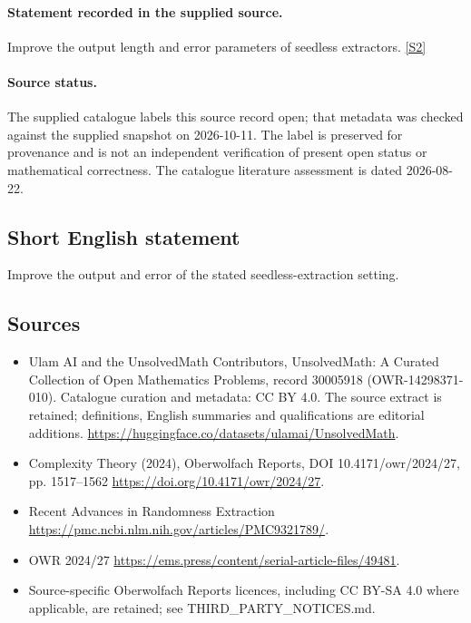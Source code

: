 \documentclass[11pt]{article}
\begin{document}
\paragraph{Statement recorded in the supplied source.}
Improve the output length and error parameters of seedless extractors. \href{https://doi.org/10.4171/owr/2024/27}{[S2]}
\paragraph{Source status.}
The supplied catalogue labels this source record open; that metadata was checked against the supplied snapshot on 2026-10-11. The label is preserved for provenance and is not an independent verification of present open status or mathematical correctness. The catalogue literature assessment is dated 2026-08-22.
\subsection{Short English statement}
Improve the output and error of the stated seedless-extraction setting.
\subsection{Sources}
\begin{itemize}
\item[S1] Ulam AI and the UnsolvedMath Contributors, UnsolvedMath: A Curated Collection of Open Mathematics Problems, record 30005918 (OWR-14298371-010). Catalogue curation and metadata: CC BY 4.0. The source extract is retained; definitions, English summaries and qualifications are editorial additions.
\url{https://huggingface.co/datasets/ulamai/UnsolvedMath}.
\item[S2] Complexity Theory (2024), Oberwolfach Reports, DOI 10.4171/owr/2024/27, pp. 1517--1562
\url{https://doi.org/10.4171/owr/2024/27}.
\item[S3] Recent Advances in Randomness Extraction
\url{https://pmc.ncbi.nlm.nih.gov/articles/PMC9321789/}.
\item[S4] OWR 2024/27
\url{https://ems.press/content/serial-article-files/49481}.
\item Source-specific Oberwolfach Reports licences, including CC BY-SA 4.0 where applicable, are retained; see THIRD\_PARTY\_NOTICES.md.
\end{itemize}
\end{document}

